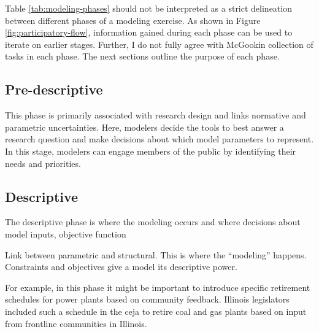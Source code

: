 Table \ref{tab:modeling-phases} should not be interpreted as a strict
delineation between different phases of a modeling exercise. As shown in Figure
\ref{fig:participatory-flow}, information gained during each phase can be used
to iterate on earlier stages. Further, I do not fully agree with McGookin collection of tasks in each phase. The next sections outline the purpose of each
phase.


\subsection{Pre-descriptive}
This phase is primarily associated with research design and links normative and 
parametric uncertainties. Here, modelers decide the tools to best answer a research question
and make decisions about which model parameters to represent. In this stage,
modelers can engage members of the public by identifying their needs and priorities.


\subsection{Descriptive}
The descriptive phase is where the modeling occurs and where decisions about 
model inputs, objective function

Link between parametric and structural. This is where the ``modeling'' happens.
Constraints and objectives give a model its descriptive power.

For example, in this phase it might be important to introduce specific
retirement schedules for power plants based on community feedback. Illinois
legislators included such a schedule in the \acf{ceja} to retire coal and gas
plants based on input from frontline communities in Illinois.

